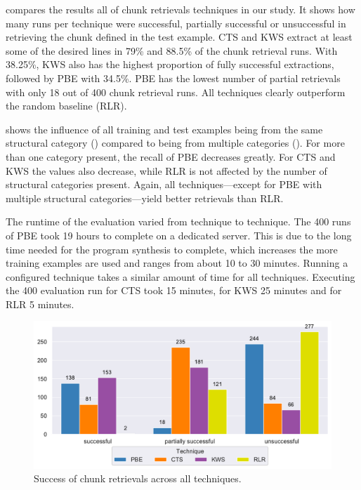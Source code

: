  compares the results all of chunk
retrievals techniques in our study.
It shows how many runs per technique were successful, partially
successful or unsuccessful in retrieving the chunk defined in the
test example.
CTS and KWS
extract at least some of the desired lines in 79\% and 88.5\%
of the chunk retrieval runs.
With 38.25\%, KWS also has the highest proportion of fully
successful extractions, followed by PBE with 34.5\%.
PBE has the
lowest number of partial retrievals with only 18 out of 400 chunk
retrieval runs.
All techniques clearly outperform the random baseline (RLR).

shows the influence of all training and test examples being from the
same structural category
()
compared to being from multiple categories
().
For more
than one category present, the recall of PBE decreases greatly.
For CTS and KWS the values also decrease, while RLR is not affected by
the number of structural categories present.
Again, all techniques---except for PBE with multiple structural
categories---yield better retrievals than RLR.

The runtime of the evaluation varied from technique to technique.
The 400 runs of PBE took 19 hours to complete on a dedicated server.
This is due to the long time needed for the program synthesis to
complete, which increases the more training examples are used and
ranges from about 10 to 30 minutes.
Running a configured technique takes a similar amount of time for all
techniques.
Executing the 400 evaluation run for CTS took 15 minutes, for KWS 25
minutes and for RLR 5 minutes.

\begin{figure}[!t]
		\centering
		\includegraphics[width=\columnwidth,
		clip]{img/big-study/success-partial-all.pdf}
		\caption{Success of chunk retrievals across all
		techniques.}
		\label{fig:success-partial-all}
\end{figure}

